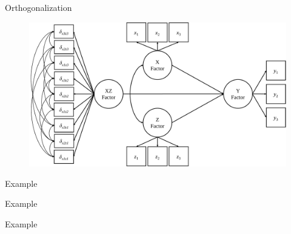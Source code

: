 \documentclass{beamer}
\begin{document}
\begin{frame}{Orthogonalization}
  
  \begin{figure}
    \includegraphics[width=\textwidth]{figures/orthoDiagram.pdf} 
  \end{figure}
  
\end{frame}



\begin{frame}[allowframebreaks]{Example}
  


\pagebreak



\end{frame}


\begin{frame}[allowframebreaks]{Example}
  


\pagebreak



\end{frame}


\begin{frame}[allowframebreaks]{Example}
  


\pagebreak



\pagebreak



\end{frame}
\end{document}
